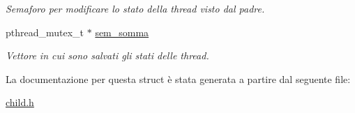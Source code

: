 \begin{DoxyCompactItemize}
\begin{DoxyCompactList}\small\item\em Semaforo per modificare lo stato della thread visto dal padre. \end{DoxyCompactList}\item 
pthread\+\_\+mutex\+\_\+t $\ast$ \hyperlink{structcomando_a108682d653147bf58f94ceecb47bdd1a}{sem\+\_\+somma}\hypertarget{structcomando_a108682d653147bf58f94ceecb47bdd1a}{}\label{structcomando_a108682d653147bf58f94ceecb47bdd1a}

\begin{DoxyCompactList}\small\item\em Vettore in cui sono salvati gli stati delle thread. \end{DoxyCompactList}\end{DoxyCompactItemize}


La documentazione per questa struct è stata generata a partire dal seguente file\+:\begin{DoxyCompactItemize}
\item 
\hyperlink{child_8h}{child.\+h}\end{DoxyCompactItemize}
